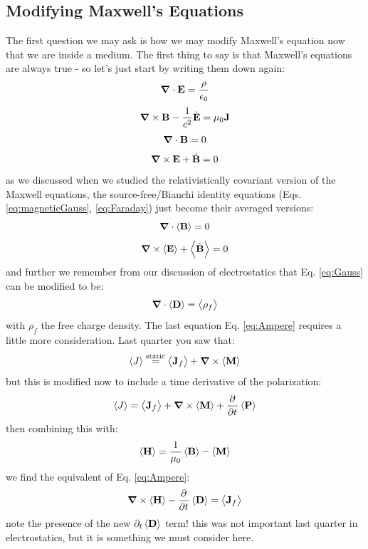 \subsection{Modifying Maxwell's Equations}
The first question we may ask is how we may modify Maxwell's equation now that we are inside a medium. The first thing to say is that Maxwell's equations are always true - so let's just start by writing them down again:
\begin{equation}\label{eq:Gauss}
    \nabla \cdot \v{E} = \frac{\rho}{\e_0}
\end{equation}
\begin{equation}\label{eq:Ampere}
    \nabla \times \v{B} - \frac{1}{c^2}\dot{\v{E}} = \mu_0 \v{J}
\end{equation}
\begin{equation}\label{eq:magneticGauss}
    \nabla \cdot \v{B} = 0
\end{equation}
\begin{equation}\label{eq:Faraday}
    \nabla \times \v{E} + \dot{\v{B}} = 0
\end{equation}
as we discussed when we studied the relativistically covariant version of the Maxwell equations, the source-free/Bianchi identity equations (Eqs. \eqref{eq:magneticGauss}, \eqref{eq:Faraday}) just become their averaged versions:
\begin{equation}
    \nabla \cdot \avg{\v{B}} = 0
\end{equation}
\begin{equation}
    \nabla \times \avg{\v{E}} + \avg{\dot{\v{B}}} = 0
\end{equation}
and further we remember from our discussion of electrostatics that Eq. \eqref{eq:Gauss} can be modified to be:
\begin{equation}
    \nabla \cdot \avg{\v{D}} = \avg{\rho_f}
\end{equation}
with $\rho_f$ the free charge density. The last equation Eq. \eqref{eq:Ampere} requires a little more consideration. Last quarter you saw that:
\begin{equation}
    \avg{J} \stackrel{\text{static}}{=} \avg{\v{J}_f} + \nabla \times \avg{\v{M}}
\end{equation}
but this is modified now to include a time derivative of the polarization:
\begin{equation}
    \avg{J} = \avg{\v{J}_f} + \nabla \times \avg{\v{M}} + \dpd{}{t}\avg{\v{P}}
\end{equation}
then combining this with:
\begin{equation}
    \left< \mathbf{H} \right> = \frac{1}{\mu_0}\left< \mathbf{B} \right> - \left< \mathbf{M} \right>
\end{equation}
we find the equivalent of Eq. \eqref{eq:Ampere}:
\begin{equation}
    \nabla \times \avg{\v{H}} - \dpd{}{t}\avg{\v{D}} = \avg{\v{J}_f}
\end{equation}
note the presence of the new $\partial_t \left< \mathbf{D} \right>$ term! this was not important last quarter in electrostatics, but it is something we must consider here.


